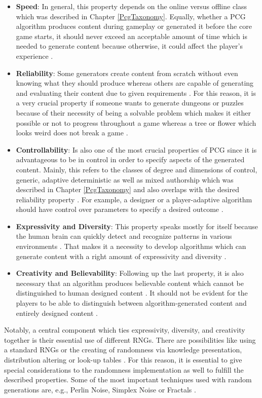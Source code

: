 \documentclass[MGS,Master,english]{twbook}%
\begin{document}
\begin{itemize}
	\item \textbf{Speed}: In general, this property depends on the online versus offline class which was described in Chapter \ref{PcgTaxonomy}. Equally, whether a \ac{PCG} algorithm produces content during gameplay or generated it before the core game starts, it should never exceed an acceptable amount of time which is needed to generate content because otherwise, it could affect the player’s experience \cite{pcg::book}. 
	\item \textbf{Reliability}: Some generators create content from scratch without even knowing what they should produce whereas others are capable of generating and evaluating their content due to given requirements \cite{pcg::book}. For this reason, it is a very crucial property if someone wants to generate dungeons or puzzles because of their necessity of being a solvable problem which makes it either possible or not to progress throughout a game whereas a tree or flower which looks weird does not break a game \cite{pcg::book}.
	\item \textbf{Controllability}: Is also one of the most crucial properties of \ac{PCG} since it is advantageous to be in control in order to specify aspects of the generated content. Mainly, this refers to the classes of degree and dimensions of control, generic, adaptive deterministic as well as mixed authorship which was described in Chapter \ref{PcgTaxonomy} and also overlaps with the desired reliability property \cite{pcg::book}. For example, a designer or a player-adaptive algorithm should have control over parameters to specify a desired outcome \cite{pcg::book}.
	\item \textbf{Expressivity and Diversity}: This property speaks mostly for itself because the human brain can quickly detect and recognize patterns in various environments \cite{pcg::book}. That makes it a necessity to develop algorithms which can generate content with a right amount of expressivity and diversity \cite{pcg::book}.
	\item \textbf{Creativity and Believability}: Following up the last property, it is also necessary that an algorithm produces believable content which cannot be distinguished to human designed content \cite{pcg::book}. It should not be evident for the players to be able to distinguish between algorithm-generated content and entirely designed content \cite{pcg::book}.
\end{itemize}

Notably, a central component which ties expressivity, diversity, and creativity together is their essential use of different \acp{RNG}. There are possibilities like using a standard \acp{RNG} or the creating of randomness via knowledge presentation, distribution altering or look-up tables \cite{pcg::book}. For this reason, it is essential to give special considerations to the randomness implementation as well to fulfill the described properties. Some of the most important techniques used with random generations are, e.g., Perlin Noise, Simplex Noise or Fractals \cite{pcg::shortHistoryOfDynamicAndPCG}.
\end{document}
